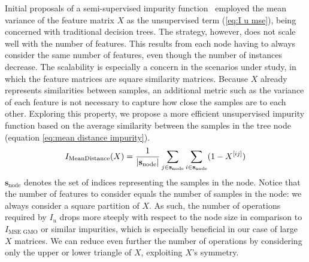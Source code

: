 Initial proposals of a semi-supervised impurity function~\cite{levatic2017semisupervised} employed the mean variance of the feature matrix $X$ as the unsupervised term (\autoref{eq:I u mse}), being concerned with traditional decision trees.
The strategy, however, does not scale well with the number of features.
This results from each node having to always consider the same number of features, even though the number of instances decrease.
The scalability is especially a concern in the scenarios under study, in which the feature matrices are square similarity matrices.
%
%
Because $X$ already represents similarities between samples, an additional metric such as the variance of each feature is not necessary to capture how close the samples are to each other. 
%
Exploring this property, we propose a more efficient unsupervised impurity function based on the average similarity between the samples in the tree node (equation \ref{eq:mean distance impurity}).
%
\begin{equation}
    I_\text{MeanDistance}(X) = \frac{1}{|\mathbf{s}_\text{node}|}
        \sum_{j \in \mathbf{s}_\text{node}}
        \sum_{i \in \mathbf{s}_\text{node}} (1 - X^{[ij]})
    \label{eq:mean distance impurity}
\end{equation}
%
$\mathbf{s}_\text{node}$ denotes the set of indices representing the samples in the node.
Notice that the number of features to consider equals the number of samples in the node: we always consider a square partition of $X$.
As such, the number of operations required by $I_u$ drops more steeply with respect to the node size in comparison to $I_\text{MSE GMO}$ or similar impurities, 
which is especially beneficial in our case of large $X$ matrices. We can reduce even further the number of operations by considering only the upper or lower triangle of $X$, exploiting $X$'s symmetry.

